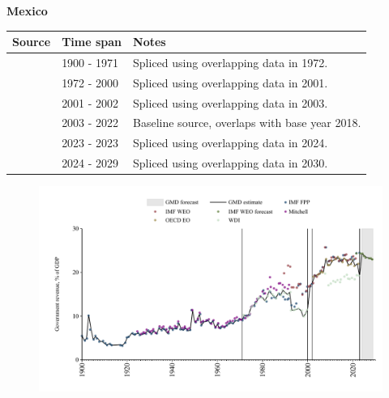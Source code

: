 \documentclass[12pt,a4paper,landscape]{article}
\begin{document}
\begin{adjustbox}{max totalsize={\paperwidth}{\paperheight},center}
\begin{minipage}[t][\textheight][t]{\textwidth}
\vspace*{0.5cm}
{}
\begin{center}
{\Large\bfseries Mexico}
\end{center}
\vspace{0.5cm}
\begin{table}[H]
\centering
\small
\begin{tabular}{|l|l|l|}
\hline
\textbf{Source} & \textbf{Time span} & \textbf{Notes} \\
\hline
\rowcolor{white}\cite{IMF_FPP}& 1900 - 1971 &Spliced using overlapping data in 1972.\\
\rowcolor{lightgray}\cite{WDI}& 1972 - 2000 &Spliced using overlapping data in 2001.\\
\rowcolor{white}\cite{IMF_WEO}& 2001 - 2002 &Spliced using overlapping data in 2003.\\
\rowcolor{lightgray}\cite{OECD_EO}& 2003 - 2022 &Baseline source, overlaps with base year 2018.\\
\rowcolor{white}\cite{WDI}& 2023 - 2023 &Spliced using overlapping data in 2024.\\
\rowcolor{lightgray}\cite{IMF_WEO_forecast}& 2024 - 2029 &Spliced using overlapping data in 2030.\\
\hline
\end{tabular}
\end{table}
\begin{figure}[H]
\centering
\includegraphics[width=\textwidth,height=0.6\textheight,keepaspectratio]{graphs/MEX_govrev_GDP.pdf}
\end{figure}
\end{minipage}
\end{adjustbox}
\end{document}

